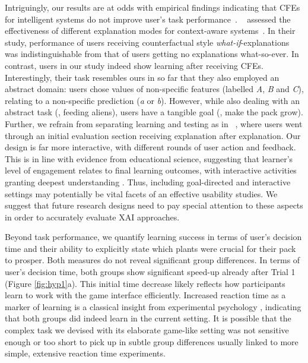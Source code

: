 Intriguingly, our results are at odds with empirical findings indicating that \glspl{CFE} for intelligent systems do not improve user's task performance~\citep{lim_why_2009, van_der_waa_evaluating_2021}.
~\citeauthor{lim_why_2009} assessed the effectiveness of different explanation modes for context-aware systems~\citep{lim_why_2009}. 
In their study, performance of users receiving counterfactual style \textit{what-if}-explanations was indistinguishable from that of users getting no explanations what-so-ever.
In contrast, users in our study indeed show learning after receiving \glspl{CFE}.
Interestingly, their task resembles ours in so far that they also employed an abstract domain: users chose values of non-specific features (labelled \textit{A}, \textit{B} and \textit{C}), relating to a non-specific prediction (\textit{a} or \textit{b}).
However, while also dealing with an abstract task (\ie, feeding aliens), users have a tangible goal (\ie, make the pack grow).
Further, we refrain from separating learning and testing as in ~\citeauthor{lim_why_2009}, where users went through an initial evaluation section receiving explanation after explanation.
Our design is far more interactive, with different rounds of user action and feedback.
This is in line with evidence from educational science, suggesting that learner's level of engagement relates to final learning outcomes, with interactive activities granting deepest understanding \citep{chi_icap_2014}.
Thus, including goal-directed and interactive settings may potentially be vital facets of an effective usability studies. 
We suggest that future research designs need to pay special attention to these aspects in order to accurately evaluate \gls{XAI} approaches.

Beyond task performance, we quantify learning success in terms of user's decision time and their ability to explicitly state which plants were crucial for their pack to prosper. %
Both measures do not reveal significant group differences.
In terms of user's decision time, both groups show significant speed-up already after Trial 1 (Figure \ref{fig:hyp1}a).
This initial time decrease likely reflects how participants learn to work with the game interface efficiently.
Increased reaction time as a marker of learning is a classical insight from experimental psychology \citep{logan_shapes_1992}, indicating that both groups did indeed learn in the current setting. 
It is possible that the complex task we devised with its elaborate game-like setting was not sensitive enough or too short to pick up in subtle group differences usually linked to more simple, extensive reaction time experiments.

